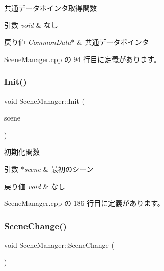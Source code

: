 共通データポインタ取得関数 


\begin{DoxyParams}{引数}
{\em void} & なし \\
\hline
\end{DoxyParams}

\begin{DoxyRetVals}{戻り値}
{\em Common\+Data$\ast$} & 共通データポインタ \\
\hline
\end{DoxyRetVals}


 Scene\+Manager.\+cpp の 94 行目に定義があります。

\mbox{\label{class_scene_manager_a3d14c04a921c6c670e89fbf22a719b00}} 
\subsubsection{\texorpdfstring{Init()}{Init()}}
{\footnotesize\ttfamily void Scene\+Manager\+::\+Init (\begin{DoxyParamCaption}\item[{\mbox{\hyperlink{class_scene_base}{Scene\+Base}} $\ast$}]{scene }\end{DoxyParamCaption})}



初期化関数 


\begin{DoxyParams}{引数}
{\em $\ast$scene} & 最初のシーン \\
\hline
\end{DoxyParams}

\begin{DoxyRetVals}{戻り値}
{\em void} & なし \\
\hline
\end{DoxyRetVals}


 Scene\+Manager.\+cpp の 186 行目に定義があります。

\mbox{\label{class_scene_manager_ab1ffc5d84cf812e4105cba755d034770}} 
\subsubsection{\texorpdfstring{Scene\+Change()}{SceneChange()}}
{\footnotesize\ttfamily void Scene\+Manager\+::\+Scene\+Change (\begin{DoxyParamCaption}{ }\end{DoxyParamCaption})\hspace{0.3cm}{\ttfamily [private]}}



